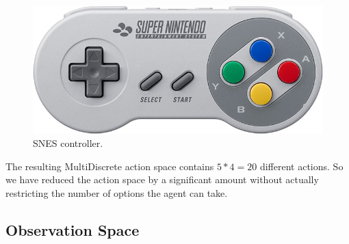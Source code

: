 \documentclass[11pt,a4paper]{article}
\begin{document}
\begin{figure}[htbp]
    \centering
    \includegraphics[width=.75\textwidth]{snes-controller}
    \caption{SNES controller.}
    \label{fig:snes-controller}
\end{figure}
The resulting MultiDiscrete action space contains $5*4 = 20$ different actions.
So we have reduced the action space by a significant amount without actually restricting the number of options the agent can take.

\subsection{Observation Space}
\end{document}
